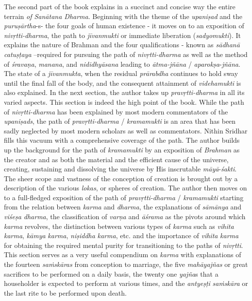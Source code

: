 {\leftskip=10pt\rightskip=10pt
The second part of the book explains in a succinct and concise way the entire terrain \emph{of Sanātana Dharma}. Beginning with the theme of the \emph{upaniṣad} and the \emph{puruṣārtha}-s- the four goals of human existence - it moves on to an exposition of \emph{nivṛtti-dharma}, the path to \emph{jīvanmukti} or immediate liberation (\emph{sadyomukti}). It explains the nature of Brahman and the four qualifications - known as \emph{sādhanā} \emph{catuṣṭaya} --required for pursuing the path of \emph{nivṛtti-dharma} as well as the method of \emph{śravaṇa}, \emph{manana}, and \emph{nididhyāsana} leading to \emph{ātma-jñāna} / \emph{aparokṣa}-\emph{jñāna}. The state of a \emph{jīvanmukta}, when the residual \emph{prārabdha} continues to hold sway until the final fall of the body, and the consequent attainment of \emph{videhamukti} is also explained. In the next section, the author takes up \emph{pravṛtti-dharma} in all its varied aspects. This section is indeed the high point of the book. While the path of \emph{nivṛtti-dharma} has been explained by most modern commentators of the \emph{upaniṣads}, the path of \emph{pravṛtti-dharma} / \emph{kramamukti} is an area that has been sadly neglected by most modern scholars as well as commentators. Nithin Sridhar fills this vacuum with a comprehensive coverage of the path. The author builds up the background for the path of \emph{kramamukti} by an exposition of \emph{Brahman} as the creator and as both the material and the efficient cause of the universe, creating, sustaining and dissolving the universe by His inscrutable \emph{māyā}-\emph{śakti}. The sheer scope and vastness of the conception of creation is brought out by a description of the various \emph{lokas}, or spheres of creation. The author then moves on to a full-fledged exposition of the path of \emph{pravṛtti-dharma} / \emph{kramamukti} starting from the relation between \emph{karma} and \emph{dharma}, the explanations of \emph{sāmānya} and \emph{viśeṣa dharma}, the classification of \emph{varṇa} and \emph{āśrama} as the pivots around which \emph{karma} revolves, the distinction between various types of \emph{karma} such as \emph{vihita} \emph{karma}, \emph{kāmya} \emph{karma}, \emph{niṣiddha} \emph{karma}, etc. and the importance of \emph{vihita} \emph{karma} for obtaining the required mental purity for transitioning to the paths of \emph{nivṛtti}. This section serves as a very useful compendium on \emph{karma} with explanations of the fourteen \emph{saṁskāras} from conception to marriage, the five \emph{mahāyajñas} or great sacrifices to be performed on a daily basis, the twenty one \emph{yajña}s that a householder is expected to perform at various times, and the \emph{antyeṣṭi} \emph{saṁskāra} or the last rite to be performed upon death.\par}
\bigskip

